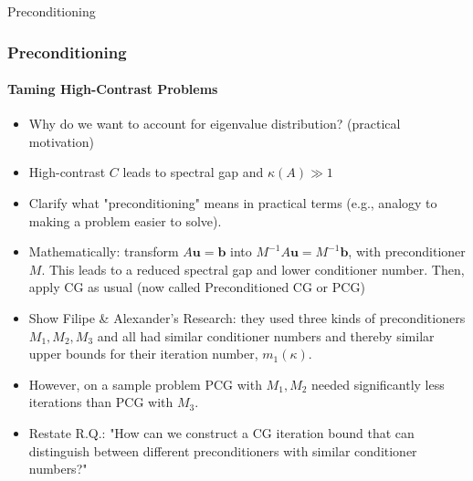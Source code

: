 \begin{frame}[label=preconditioning]{Preconditioning}
    \frametitle{Preconditioning}
    \framesubtitle{Taming High-Contrast Problems}
        \begin{itemize}
            \item<1-> Why do we want to account for eigenvalue distribution? (practical motivation)
            \item<2-> High-contrast $C$ leads to spectral gap and $\kappa(A)\gg1$
            \item<3-> Clarify what "preconditioning" means in practical terms (e.g., analogy to making a problem easier to solve).
            \item<4-> Mathematically: transform $A\mathbf{u}=\mathbf{b}$ into $M^{-1}A\mathbf{u}=M^{-1}\mathbf{b}$, with preconditioner $M$. This leads to a reduced spectral gap and lower conditioner number. Then, apply CG as usual (now called Preconditioned CG or PCG)
            \item<5-> Show Filipe \& Alexander's Research: they used three kinds of preconditioners $M_1, M_2, M_3$ and all had similar conditioner numbers and thereby similar upper bounds for their iteration number, $m_1(\kappa)$.
            \item<6-> However, on a sample problem PCG with $M_1,M_2$ needed significantly less iterations than PCG with $M_3$.
            \item<7-> Restate R.Q.: "How can we construct a CG iteration bound that can distinguish between different preconditioners with similar conditioner numbers?"
        \end{itemize}
\end{frame}